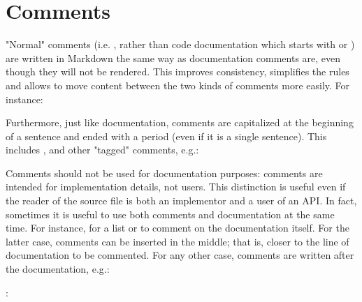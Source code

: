 \documentclass[a4paper,11pt,english]{sphinxmanual}
\begin{document}
\section{Comments}
\label{\detokenize{coding-guidelines:comments}}
"Normal" comments (i.e. \sphinxcode{\sphinxupquote{//}}, rather than code documentation which starts
with \sphinxcode{\sphinxupquote{///}} or \sphinxcode{\sphinxupquote{//!}}) are written in Markdown the same way as documentation
comments are, even though they will not be rendered. This improves consistency,
simplifies the rules and allows to move content between the two kinds of
comments more easily. For instance:

\begin{sphinxVerbatim}[commandchars=\\\{\}]
\end{sphinxVerbatim}

Furthermore, just like documentation, comments are capitalized at the beginning
of a sentence and ended with a period (even if it is a single sentence). This
includes ,  and other "tagged" comments, e.g.:

\begin{sphinxVerbatim}[commandchars=\\\{\}]
\end{sphinxVerbatim}

Comments should not be used for documentation purposes: comments are intended
for implementation details, not users. This distinction is useful even if the
reader of the source file is both an implementor and a user of an API. In fact,
sometimes it is useful to use both comments and documentation at the same time.
For instance, for a  list or to comment on the documentation itself.
For the latter case, comments can be inserted in the middle; that is, closer to
the line of documentation to be commented. For any other case, comments are
written after the documentation, e.g.:

\begin{sphinxVerbatim}[commandchars=\\\{\}]
 : \PYGZhy{}\PYGZgt{} 
\end{sphinxVerbatim}
\end{document}
